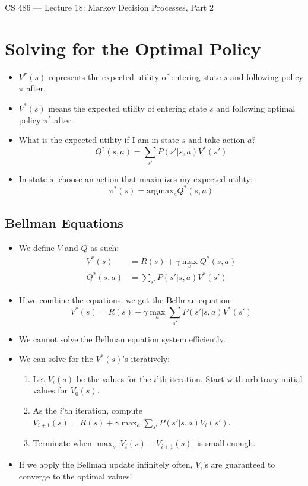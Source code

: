 \documentclass{article}
\author{Clement Tsang}
\begin{document}
\begin{center}
    \Large{CS 486 --- Lecture 18: Markov Decision Processes, Part 2}
\end{center}

\section{Solving for the Optimal Policy}
\begin{itemize}
    \item $V^{\pi}(s)$ represents the expected utility of entering state $s$ and following policy $\pi$ after.
    \item $V^*(s)$ means the expected utility of entering state $s$ and following optimal policy $\pi^*$ after.
    \item What is the expected utility if I am in state $s$ and take action $a$?
        \[
            Q^*(s, a) = \sum_{s'} P(s' | s, a) V^*(s')
        \]
    \item In state $s$, choose an action that maximizes my expected utility:
        \[
            \pi^*(s) = \text{argmax}_a Q^*(s, a)
        \]
\end{itemize}

\subsection{Bellman Equations}
\begin{itemize}
    \item We define $V$ and $Q$ as such:
        \begin{align*}
            V^*(s) &= R(s) + \gamma \max_a Q^*(s, a)\\
            Q^*(s, a) &= \sum_{s'} P(s' | s, a) V^*(s')
        \end{align*}
    \item If we combine the equations, we get the Bellman equation:
        \[
            V^*(s) = R(s) + \gamma \max_a \sum_{s'} P(s' | s,a) V^*(s')
        \]
    \item We cannot solve the Bellman equation system efficiently.
    \item We can solve for the $V^*(s)$'s iteratively:
        \begin{enumerate}
            \item Let $V_i(s)$ be the values for the $i$'th iteration.  Start with arbitrary initial values for $V_0(s)$.
            \item As the $i$'th iteration, compute $V_{i+1}(s) = R(s) + \gamma \max_a \sum_{s'} P(s' | s, a) V_i(s')$.
            \item Terminate when $\max_s|V_i(s) - V_{i+1}(s)|$ is small enough.
        \end{enumerate}
    \item If we apply the Bellman update infinitely often, $V_i$'s are guaranteed to converge to the optimal values!
\end{itemize}
\end{document}
